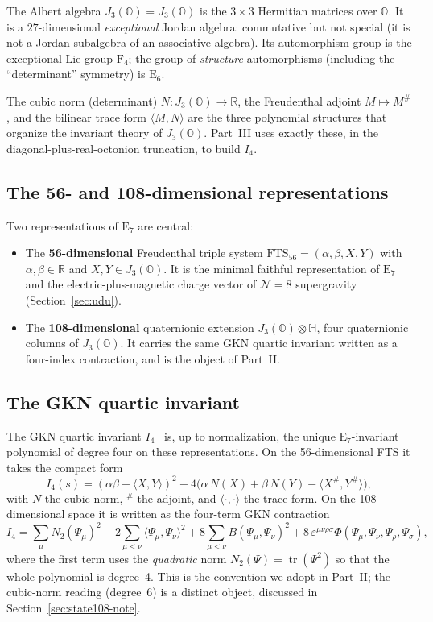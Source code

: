 \documentclass[11pt]{article}
\theoremstyle{definition}
\DeclareMathOperator{\tr}{tr}
\newcommand{\OO}{\mathbb{O}}
\newcommand{\HH}{\mathbb{H}}
\newcommand{\RR}{\mathbb{R}}
\newcommand{\Jthree}{J_3(\OO)}
\newcommand{\Iq}{I_4}
\newcommand{\FTS}{\mathrm{FTS}_{56}}
\newcommand{\Eseven}{\mathrm{E}_7}
\begin{document}
The Albert algebra $\Jthree = J_3(\OO)$ is the $3\times 3$ Hermitian matrices
over $\OO$. It is a $27$-dimensional \emph{exceptional} Jordan algebra:
commutative but not special (it is not a Jordan subalgebra of an associative
algebra). Its automorphism group is the exceptional Lie group $\mathrm{F}_4$;
the group of \emph{structure} automorphisms (including the ``determinant''
symmetry) is $\mathrm{E}_6$.

The cubic norm (determinant) $N:\Jthree\to\RR$, the Freudenthal adjoint
$M\mapsto M^\#$, and the bilinear trace form $\langle M,N\rangle$ are the three
polynomial structures that organize the invariant theory of $\Jthree$. Part~III
uses exactly these, in the diagonal-plus-real-octonion truncation, to build
$\Iq$.

\subsection{The 56- and 108-dimensional representations}
\label{sec:56108}

Two representations of $\Eseven$ are central:
\begin{itemize}[leftmargin=2em]
\item The \textbf{56-dimensional} Freudenthal triple system
$\FTS = (\alpha,\beta,X,Y)$ with $\alpha,\beta\in\RR$ and
$X,Y\in\Jthree$. It is the minimal faithful representation of $\Eseven$ and the
electric-plus-magnetic charge vector of $\mathcal{N}=8$ supergravity
(Section~\ref{sec:udu}).
\item The \textbf{108-dimensional} quaternionic extension
$\Jthree\otimes\HH$, four quaternionic columns of $\Jthree$. It carries the
same GKN quartic invariant written as a four-index contraction, and is the
object of Part~II.
\end{itemize}

\subsection{The GKN quartic invariant}
\label{sec:gkn-formula}

The GKN quartic invariant $\Iq$~\cite{gkn2001} is, up to normalization, the
unique $\Eseven$-invariant polynomial of degree four on these
representations. On the 56-dimensional FTS it takes the compact form
\[
\Iq(s) = (\alpha\beta - \langle X,Y\rangle)^2
 - 4\bigl(\alpha\,N(X) + \beta\,N(Y) - \langle X^\#, Y^\#\rangle\bigr),
\]
with $N$ the cubic norm, $^\#$ the adjoint, and $\langle\cdot,\cdot\rangle$ the
trace form. On the 108-dimensional space it is written as the four-term GKN
contraction
\[
\Iq = \sum_\mu N_2(\Psi_\mu)^2
     - 2\sum_{\mu<\nu} \langle\Psi_\mu,\Psi_\nu\rangle^2
     + 8\sum_{\mu<\nu} B(\Psi_\mu,\Psi_\nu)^2
     + 8\,\varepsilon^{\mu\nu\rho\sigma}
       \Phi(\Psi_\mu,\Psi_\nu,\Psi_\rho,\Psi_\sigma),
\]
where the first term uses the \emph{quadratic} norm
$N_2(\Psi)= \tr(\Psi^2)$ so that the whole polynomial is degree~4. This is the
convention we adopt in Part~II; the cubic-norm reading (degree~6) is a distinct
object, discussed in Section~\ref{sec:state108-note}.
\end{document}
